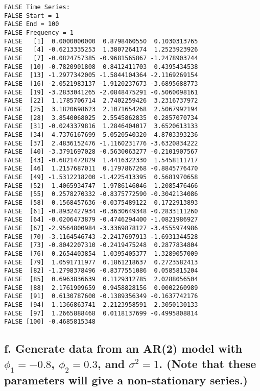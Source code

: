 \documentclass[openany]{book}
\begin{document}
\begin{verbatim}
FALSE Time Series:
FALSE Start = 1 
FALSE End = 100 
FALSE Frequency = 1 
FALSE   [1]  0.0000000000  0.8798460550  0.1030313765
FALSE   [4] -0.6213335253  1.3807264174  1.2523923926
FALSE   [7] -0.0824757385 -0.9681565867 -1.2478903744
FALSE  [10] -0.7820901808  0.8412411703  0.4395434538
FALSE  [13] -1.2977342005 -1.5844104364 -2.1169269154
FALSE  [16] -2.0521983137 -1.9120237673 -3.6895688773
FALSE  [19] -3.2833041265 -2.0848475291 -0.5060098161
FALSE  [22]  1.1785706714  2.7402259426  3.2316737972
FALSE  [25]  3.1820698623  2.1071654268  2.5067992194
FALSE  [28]  3.8540068025  2.5545862835  0.2857070734
FALSE  [31] -0.0243379816  1.2846404017  3.6520613133
FALSE  [34]  4.7376167699  5.0520540320  4.8703393236
FALSE  [37]  2.4836152476 -1.1160231776 -3.6320834222
FALSE  [40] -3.3791697028 -0.5630063277 -0.2101907567
FALSE  [43] -0.6821472829  1.4416322330  1.5458111717
FALSE  [46]  1.2157687011  0.1797867268 -0.8845776470
FALSE  [49] -1.5312218200 -1.4225413395  0.5681970658
FALSE  [52]  1.4065934747  1.9786146046  1.2085476466
FALSE  [55]  0.2578270332 -0.8375772590 -0.3042134086
FALSE  [58]  0.1568457636 -0.0375489122  0.1722913893
FALSE  [61] -0.8932427934 -0.3630649348 -0.2833111260
FALSE  [64] -0.0206473879 -0.4746294400 -1.0821986927
FALSE  [67] -2.9564800984 -3.3369878127 -3.4555974986
FALSE  [70] -3.1164546743 -2.2417697913 -1.6931344528
FALSE  [73] -0.8042207310 -0.2419475248  0.2877834804
FALSE  [76]  0.2654403854  1.0395405377  1.3289057009
FALSE  [79]  1.0591711977  0.1861218637  0.2723582413
FALSE  [82] -1.2798378496 -0.8377551086  0.0585815204
FALSE  [85]  0.6963836639  0.1129312785  2.0288056504
FALSE  [88]  2.1761909659  0.9458828156  0.0002260989
FALSE  [91]  0.6130787600 -0.1389356349 -0.1637742176
FALSE  [94]  1.1366863741  2.2123958591  2.3050130133
FALSE  [97]  1.2665888468  0.0118137699 -0.4995808814
FALSE [100] -0.4685815348
\end{verbatim}

\hypertarget{f.-generate-data-from-an-ar2-model-with-phi_1-0.8-phi_20.3-and-sigma21.-note-that-these-parameters-will-give-a-non-stationary-series.}{%
\subsection{\texorpdfstring{f. Generate data from an AR(2) model with \(\phi_1=-0.8\), \(\phi_2=0.3\), and \(\sigma^2=1\). (Note that these parameters will give a non-stationary series.)}{f. Generate data from an AR(2) model with \textbackslash{}phi\_1=-0.8, \textbackslash{}phi\_2=0.3, and \textbackslash{}sigma\^{}2=1. (Note that these parameters will give a non-stationary series.)}}\label{f.-generate-data-from-an-ar2-model-with-phi_1-0.8-phi_20.3-and-sigma21.-note-that-these-parameters-will-give-a-non-stationary-series.}}
\end{document}
